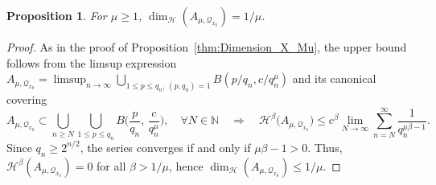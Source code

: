 \documentclass[11pt,reqno]{amsart}
\newtheorem{prop}[thm]{Proposition}
\theoremstyle{definition}
\begin{document}
\begin{prop}\label{thm:Dimension_A_Mu_Q_x0}
For $\mu \geq 1$, $\operatorname{dim}_{\mathcal H} (A_{\mu,\mathcal Q_{x_0}} ) =1/\mu$. 
\end{prop}
\begin{proof}
As in the proof of Proposition~\ref{thm:Dimension_X_Mu}, 
the upper bound follows from the limsup expression
$ A_{\mu,\mathcal Q_{x_0}}  = \limsup_{n \to \infty} \bigcup_{  1 \leq p \leq q_n,  \,  (p,q_n) = 1 } B( p/q_n, c/q_n^\mu )$
and its canonical covering 
\begin{equation}\label{eq:Canonical_Covering_A_MuQx0}
A_{\mu,\mathcal Q_{x_0}}   \subset  \bigcup_{n \geq N}  \bigcup_{1 \leq p \leq q_n} B\Big( \frac{p}{q_n}, \, \frac{c}{q_n^\mu}  \Big), \quad \forall N \in \mathbb N
\quad \Longrightarrow \quad
\mathcal H^\beta \big( A_{\mu,\mathcal Q_{x_0}}   \big) \leq c^\beta \lim_{N \to \infty}  \sum_{n = N}^\infty \frac{1}{q_n^{\mu \beta - 1}}. 
\end{equation}
Since $q_n \geq 2^{n/2}$, the series converges if and only if $\mu \beta - 1 > 0$. 
Thus, $\mathcal H^\beta (A_{ \mu,\mathcal Q_{x_0}}) = 0$ for all $\beta > 1/\mu$, 
hence $\operatorname{dim}_{\mathcal H} (A_{\mu,\mathcal Q_{x_0}}) \leq 1/\mu$. 


\end{proof}
\end{document}
